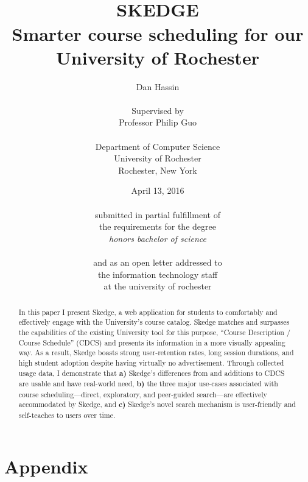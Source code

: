 \documentclass[titlepage]{report}
\title{
\vspace{50pt}\\
\huge \bfseries SKEDGE
\\
\vspace{10pt}
\Large
Smarter course scheduling for our\\
University of Rochester
}
\author{
	Dan Hassin\\
    \vspace{5pt}\\
    Supervised by\\
    Professor Philip Guo\\
    \vspace{2pt}\\
    Department of Computer Science\\
    University of Rochester\\
    Rochester, New York\\
}
\date{April 13, 2016\\
    \vspace{100pt}\\
    submitted in partial fulfillment of\\
    the requirements for the degree\\
    \emph{honors bachelor of science}\\
    \vspace{30pt}\\
    and as an open letter addressed to\\
    the information technology staff\\
    at the university of rochester
    \vspace{-30pt}
}
\begin{document}
\maketitle


\onehalfspacing

\setcounter{tocdepth}{1}
\tableofcontents

\listoffigures

\clearpage


\doublespacing


\begin{abstract}

\thispagestyle{plain}

In this paper I present Skedge, a web application for students to comfortably and effectively engage with the University's course catalog. Skedge matches and surpasses the capabilities of the existing University tool for this purpose, ``Course Description / Course Schedule'' (CDCS) and presents its information in a more visually appealing way. As a result, Skedge boasts strong user-retention rates, long session durations, and high student adoption despite having virtually no advertisement. Through collected usage data, I demonstrate that \textbf{a)} Skedge's differences from and additions to CDCS are usable and have real-world need, \textbf{b)} the three major use-cases associated with course scheduling---direct, exploratory, and peer-guided search---are effectively accommodated by Skedge, and \textbf{c)} Skedge's novel search mechanism is user-friendly and self-teaches to users over time.

\end{abstract}




\setlength{\skip\footins}{0.75cm}



\clearpage


\clearpage


\clearpage


\clearpage


\clearpage


\singlespacing





\clearpage
\section*{Appendix}
\end{document}
